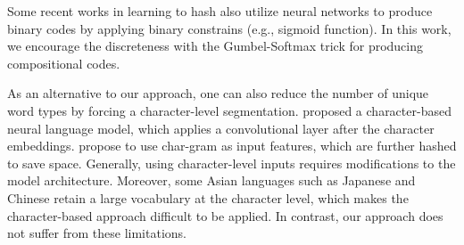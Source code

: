 \documentclass{article} %
\begin{document}


Some recent works \citep{Xia2014SupervisedHF,Liu2016DeepSH,Yang2017SupervisedLO} in learning to hash also utilize neural networks to produce binary codes by applying binary constrains (e.g., sigmoid function). In this work, we encourage the discreteness with the Gumbel-Softmax trick for producing compositional codes.






As an alternative to our approach, one can also reduce the number of unique word types by forcing a character-level segmentation. \citet{Kim2016CharacterAwareNL} proposed a character-based neural language model, which applies a convolutional layer after the character embeddings. \citet{Botha2017NaturalLP} propose to use char-gram as input features, which are further hashed to save space. Generally, using character-level inputs requires modifications to the model architecture. Moreover, some Asian languages such as Japanese and Chinese retain a large vocabulary at the character level, which makes the character-based approach difficult to be applied. In contrast, our approach does not suffer from these limitations.
\end{document}
